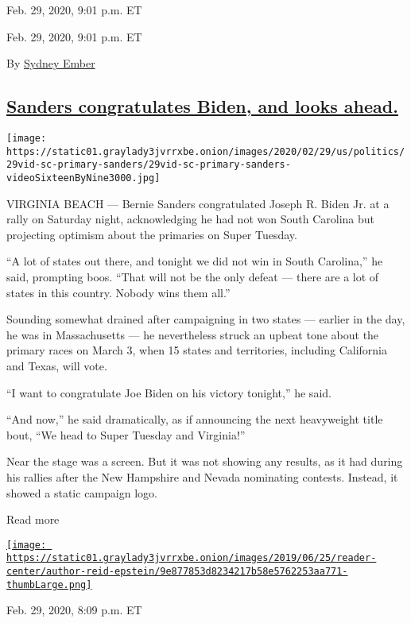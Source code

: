 Feb. 29, 2020, 9:01 p.m. ET

Feb. 29, 2020, 9:01 p.m. ET

By \href{https://www.nytimes3xbfgragh.onion/by/sydney-ember}{Sydney
Ember}

\hypertarget{sanders-congratulates-biden-and-looks-ahead}{%
\subsection{\texorpdfstring{\protect\hyperlink{bernie-sanders-speech}{Sanders
congratulates Biden, and looks
ahead.}}{Sanders congratulates Biden, and looks ahead.}}\label{sanders-congratulates-biden-and-looks-ahead}}

\texttt{[image: https://static01.graylady3jvrrxbe.onion/images/2020/02/29/us/politics/29vid-sc-primary-sanders/29vid-sc-primary-sanders-videoSixteenByNine3000.jpg]}

VIRGINIA BEACH --- Bernie Sanders congratulated Joseph R. Biden Jr. at a
rally on Saturday night, acknowledging he had not won South Carolina but
projecting optimism about the primaries on Super Tuesday.

``A lot of states out there, and tonight we did not win in South
Carolina,'' he said, prompting boos. ``That will not be the only defeat
--- there are a lot of states in this country. Nobody wins them all.''

Sounding somewhat drained after campaigning in two states --- earlier in
the day, he was in Massachusetts --- he nevertheless struck an upbeat
tone about the primary races on March 3, when 15 states and territories,
including California and Texas, will vote.

``I want to congratulate Joe Biden on his victory tonight,'' he said.

``And now,'' he said dramatically, as if announcing the next heavyweight
title bout, ``We head to Super Tuesday and Virginia!''

Near the stage was a screen. But it was not showing any results, as it
had during his rallies after the New Hampshire and Nevada nominating
contests. Instead, it showed a static campaign logo.

Read more

\href{https://www.nytimes3xbfgragh.onion/by/reid-j-epstein}{\texttt{[image: https://static01.graylady3jvrrxbe.onion/images/2019/06/25/reader-center/author-reid-epstein/9e877853d8234217b58e5762253aa771-thumbLarge.png]}}

Feb. 29, 2020, 8:09 p.m. ET

